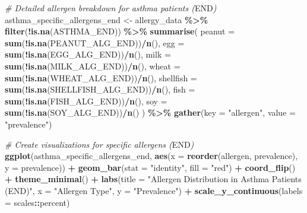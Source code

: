 \documentclass[
]{article}
\newenvironment{Shaded}{\begin{snugshade}}{\end{snugshade}}
\newcommand{\AttributeTok}[1]{\textcolor[rgb]{0.13,0.29,0.53}{#1}}
\newcommand{\CommentTok}[1]{\textcolor[rgb]{0.56,0.35,0.01}{\textit{#1}}}
\newcommand{\FunctionTok}[1]{\textcolor[rgb]{0.13,0.29,0.53}{\textbf{#1}}}
\newcommand{\NormalTok}[1]{#1}
\newcommand{\OtherTok}[1]{\textcolor[rgb]{0.56,0.35,0.01}{#1}}
\newcommand{\RegionMarkerTok}[1]{#1}
\newcommand{\SpecialCharTok}[1]{\textcolor[rgb]{0.81,0.36,0.00}{\textbf{#1}}}
\newcommand{\StringTok}[1]{\textcolor[rgb]{0.31,0.60,0.02}{#1}}
\begin{document}
\begin{Shaded}
\begin{Highlighting}[]
\CommentTok{\# Detailed allergen breakdown for asthma patients (}\RegionMarkerTok{END}\CommentTok{)}
\NormalTok{asthma\_specific\_allergens\_end }\OtherTok{\textless{}{-}}\NormalTok{ allergy\_data }\SpecialCharTok{\%\textgreater{}\%}
  \FunctionTok{filter}\NormalTok{(}\SpecialCharTok{!}\FunctionTok{is.na}\NormalTok{(ASTHMA\_END)) }\SpecialCharTok{\%\textgreater{}\%}
  \FunctionTok{summarise}\NormalTok{(}
    \AttributeTok{peanut =} \FunctionTok{sum}\NormalTok{(}\SpecialCharTok{!}\FunctionTok{is.na}\NormalTok{(PEANUT\_ALG\_END))}\SpecialCharTok{/}\FunctionTok{n}\NormalTok{(),}
    \AttributeTok{egg =} \FunctionTok{sum}\NormalTok{(}\SpecialCharTok{!}\FunctionTok{is.na}\NormalTok{(EGG\_ALG\_END))}\SpecialCharTok{/}\FunctionTok{n}\NormalTok{(),}
    \AttributeTok{milk =} \FunctionTok{sum}\NormalTok{(}\SpecialCharTok{!}\FunctionTok{is.na}\NormalTok{(MILK\_ALG\_END))}\SpecialCharTok{/}\FunctionTok{n}\NormalTok{(),}
    \AttributeTok{wheat =} \FunctionTok{sum}\NormalTok{(}\SpecialCharTok{!}\FunctionTok{is.na}\NormalTok{(WHEAT\_ALG\_END))}\SpecialCharTok{/}\FunctionTok{n}\NormalTok{(),}
    \AttributeTok{shellfish =} \FunctionTok{sum}\NormalTok{(}\SpecialCharTok{!}\FunctionTok{is.na}\NormalTok{(SHELLFISH\_ALG\_END))}\SpecialCharTok{/}\FunctionTok{n}\NormalTok{(),}
    \AttributeTok{fish =} \FunctionTok{sum}\NormalTok{(}\SpecialCharTok{!}\FunctionTok{is.na}\NormalTok{(FISH\_ALG\_END))}\SpecialCharTok{/}\FunctionTok{n}\NormalTok{(),}
    \AttributeTok{soy =} \FunctionTok{sum}\NormalTok{(}\SpecialCharTok{!}\FunctionTok{is.na}\NormalTok{(SOY\_ALG\_END))}\SpecialCharTok{/}\FunctionTok{n}\NormalTok{()}
\NormalTok{  ) }\SpecialCharTok{\%\textgreater{}\%}
  \FunctionTok{gather}\NormalTok{(}\AttributeTok{key =} \StringTok{"allergen"}\NormalTok{, }\AttributeTok{value =} \StringTok{"prevalence"}\NormalTok{)}

\CommentTok{\# Create visualizations for specific allergens (}\RegionMarkerTok{END}\CommentTok{)}
\FunctionTok{ggplot}\NormalTok{(asthma\_specific\_allergens\_end, }
       \FunctionTok{aes}\NormalTok{(}\AttributeTok{x =} \FunctionTok{reorder}\NormalTok{(allergen, prevalence), }\AttributeTok{y =}\NormalTok{ prevalence)) }\SpecialCharTok{+}
  \FunctionTok{geom\_bar}\NormalTok{(}\AttributeTok{stat =} \StringTok{"identity"}\NormalTok{, }\AttributeTok{fill =} \StringTok{"red"}\NormalTok{) }\SpecialCharTok{+}
  \FunctionTok{coord\_flip}\NormalTok{() }\SpecialCharTok{+}
  \FunctionTok{theme\_minimal}\NormalTok{() }\SpecialCharTok{+}
  \FunctionTok{labs}\NormalTok{(}\AttributeTok{title =} \StringTok{"Allergen Distribution in Asthma Patients (END)"}\NormalTok{,}
       \AttributeTok{x =} \StringTok{"Allergen Type"}\NormalTok{,}
       \AttributeTok{y =} \StringTok{"Prevalence"}\NormalTok{) }\SpecialCharTok{+}
  \FunctionTok{scale\_y\_continuous}\NormalTok{(}\AttributeTok{labels =}\NormalTok{ scales}\SpecialCharTok{::}\NormalTok{percent)}
\end{Highlighting}
\end{Shaded}
\end{document}
